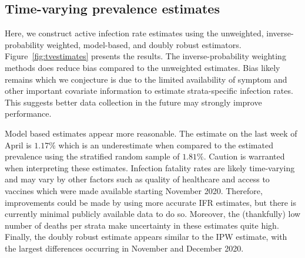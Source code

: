 \documentclass[11pt]{amsart}
\numberwithin{equation}{section}
\theoremstyle{plain}
\def\new{\text{new}}
\begin{document}


 \subsection{Time-varying prevalence estimates}

 Here, we construct active infection rate estimates using the unweighted, inverse-probability weighted, model-based, and doubly robust estimators.  Figure~\ref{fig:tvestimates} presents the results. The inverse-probability weighting methods does reduce bias compared to the unweighted estimates. Bias likely remains which we conjecture is due to the limited availability of symptom and other important covariate information to estimate strata-specific infection rates. This suggests better data collection in the future may strongly improve performance.

 Model based estimates appear more reasonable.  The estimate on the last week of April is $1.17\%$ which is an underestimate when compared to the estimated prevalence using the stratified random sample of $1.81\%$. Caution is warranted when interpreting these estimates.  Infection fatality rates are likely time-varying and may vary by other factors such as quality of healthcare and access to vaccines which were made available starting November 2020.  Therefore, improvements could be made by using more accurate IFR estimates, but there is currently minimal publicly available data to do so.  Moreover, the (thankfully) low number of deaths per strata make uncertainty in these estimates quite high.  Finally, the doubly robust estimate appears similar to the IPW estimate, with the largest differences occurring in November and December 2020.
\end{document}
